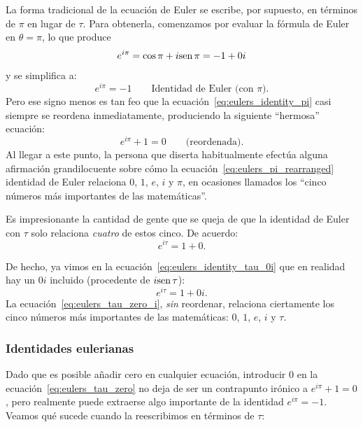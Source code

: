 La forma tradicional de la ecuación de Euler se escribe, por supuesto, en términos de $\pi$ en lugar de $\tau$. Para obtenerla, comenzamos por evaluar la fórmula de Euler en $\theta = \pi$, lo que produce
\begin{equation}
\label{eq:eulers_identity_pi_unsimplified}
e^{i\pi} = \cos \pi + i \mbox{sen}\, \pi = -1 + 0i
\end{equation}
y se simplifica a:
\begin{equation}
\label{eq:eulers_identity_pi}
e^{i\pi} = -1 \qquad\mbox{Identidad de Euler (con $\pi$).}
\end{equation}
Pero ese signo menos es tan feo que la ecuación~\eqref{eq:eulers_identity_pi} casi siempre se reordena inmediatamente, produciendo la siguiente ``hermosa'' ecuación:
\begin{equation}
\label{eq:eulers_pi_rearranged}
e^{i\pi} + 1 = 0 \qquad\mbox{(reordenada).}
\end{equation}
Al llegar a este punto, la persona que diserta habitualmente efectúa alguna afirmación grandilocuente sobre cómo la ecuación~\eqref{eq:eulers_pi_rearranged} identidad de Euler relaciona $0$, $1$, $e$, $i$ y $\pi$, en ocasiones llamados los ``cinco números más importantes de las matemáticas''. 

Es impresionante la cantidad de gente que se queja de que la identidad de Euler con $\tau$ solo relaciona \emph{cuatro} de estos cinco. De acuerdo:
\begin{equation} 
  \label{eq:eulers_tau_zero}
e^{i\tau} = 1 + 0.
\end{equation}

De hecho, ya vimos en la ecuación~\eqref{eq:eulers_identity_tau_0i} que en realidad hay un $0i$ incluido (procedente de $i \mbox{sen}\,\tau$):
\begin{equation}
\label{eq:eulers_tau_zero_i}
e^{i\tau} = 1 + 0i.
\end{equation}
La ecuación~\eqref{eq:eulers_tau_zero_i}, \emph{sin} reordenar, relaciona ciertamente los cinco números más importantes de las matemáticas: $0$, $1$, $e$, $i$ y $\tau$.

      \subsubsection{Identidades eulerianas} %
      \label{sec:eulerian_identities}

Dado que es posible añadir cero en cualquier ecuación, introducir $0$ en la ecuación~\eqref{eq:eulers_tau_zero} no deja de ser un contrapunto irónico a $e^{i\pi} + 1 = 0$, pero realmente puede extraerse algo importante de la identidad $e^{i\pi} = -1$. Veamos qué sucede cuando la reescribimos en términos de $\tau$:

